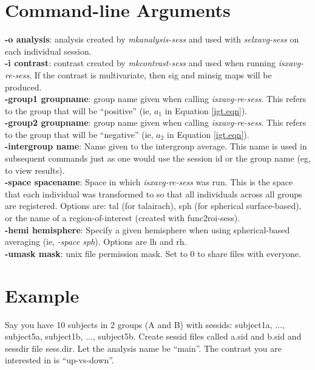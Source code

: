 \documentclass[10pt]{article}
\begin{document}
\section{Command-line Arguments}

\noindent
{\bf -o analysis}: analysis created by {\em mkanalysis-sess} and used
with {\em selxavg-sess} on each individual session.\\

\noindent
{\bf -i contrast}: contrast created by {\em mkcontrast-sess} and used
when running {\em isxavg-re-sess}. If the contrast is multivariate,
then sig and minsig maps will be produced.\\

\noindent
{\bf -group1 groupname}: group name given when calling {\em
isxavg-re-sess}. This refers to the group that will be ``positive''
(ie, $a_1$ in Equation \ref{igt.eqn}).\\

\noindent
{\bf -group2 groupname}: group name given when calling {\em
isxavg-re-sess}. This refers to the group that will be ``negative''
(ie, $a_2$ in Equation \ref{igt.eqn}).\\

\noindent
{\bf -intergroup name}: Name given to the intergroup average. This
name is used in subsequent commands just as one would use the session
id or the group name (eg, to view results).\\

\noindent
{\bf -space spacename}: Space in which {\em isxavg-re-sess} was
run. This is the space that each individual was transformed to so that
all individuals across all groups are registered. Options are: tal (for
talairach), sph (for spherical surface-based), or the name of a
region-of-interest (created with func2roi-sess).\\

\noindent
{\bf -hemi hemisphere}: Specify a given hemisphere when using
spherical-based averaging (ie, {\em -space sph}). Options are lh and
rh.\\ 

\noindent
{\bf -umask mask}: unix file permission mask. Set to 0 to share files
with everyone.\\

\section{Example}

Say you have 10 subjects in 2 groups (A and B) with sessids:
subject1a, ..., subject5a, subject1b, ..., subject5b. Create sessid
files called a.sid and b.sid and sessdir file sess.dir. Let the
analysis name be ``main''. The contrast you are interested in is
``up-vs-down''. \\
\end{document}
